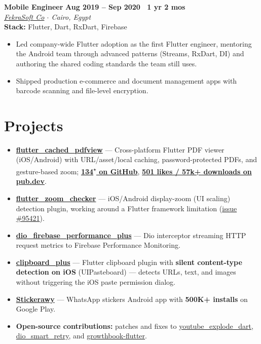\documentclass[10pt,a4paper]{article}
\newcommand{\workexp}[5]{
    \noindent \textbf{#1} \hfill \textbf{#2} \\
    \textit{#3} \\
    {\small\color{techstack}\textbf{Stack:} #4}
    \vspace{0pt}
    \begin{itemize}[itemsep=2.4pt,parsep=0pt,topsep=2pt,leftmargin=1.5em]
    #5
    \end{itemize}
    \vspace{3pt}
}
\begin{document}
    \workexp{Mobile Engineer}{Aug 2019 -- Sep 2020 \textbullet\ 1 yr 2 mos}
    {\href{https://www.linkedin.com/company/fekrasoft}{FekraSoft Co} $\cdot$ Cairo, Egypt}
    {Flutter, Dart, RxDart, Firebase}
    {
        \item Led company-wide Flutter adoption as the first Flutter engineer, mentoring the Android team through advanced patterns (Streams, RxDart, DI) and authoring the shared coding standards the team still uses.
    \item Shipped production e-commerce and document management apps with barcode scanning and file-level encryption.
    }



    \section{Projects}\label{sec:projects}
    \begin{itemize}[itemsep=3pt,parsep=0pt,topsep=2pt,leftmargin=1.5em]
    \item \textbf{\href{https://pub.dev/packages/flutter_cached_pdfview}{flutter\_cached\_pdfview}} --- Cross-platform Flutter PDF viewer (iOS/Android) with URL/asset/local caching, password-protected PDFs, and gesture-based zoom; \textbf{\href{https://github.com/binSaed/flutter_cached_pdfview}{134\textsuperscript{$\star$} on GitHub}}, \textbf{\href{https://pub.dev/packages/flutter_cached_pdfview}{501 likes / 57k+ downloads on pub.dev}}.
    \item \textbf{\href{https://pub.dev/packages/flutter_zoom_checker}{flutter\_zoom\_checker}} --- iOS/Android display-zoom (UI scaling) detection plugin, working around a Flutter framework limitation (\href{https://github.com/flutter/flutter/issues/95421}{issue \#95421}).
    \item \textbf{\href{https://github.com/binSaed/dio_firebase_performance_plus}{dio\_firebase\_performance\_plus}} --- Dio interceptor streaming HTTP request metrics to Firebase Performance Monitoring.
    \item \textbf{\href{https://pub.dev/packages/clipboard_plus}{clipboard\_plus}} --- Flutter clipboard plugin with \textbf{silent content-type detection on iOS} (UIPasteboard) --- detects URLs, text, and images without triggering the iOS paste permission dialog.
    \item \textbf{\href{https://play.google.com/store/apps/details?id=com.stickerawy.stickers}{Stickerawy}} --- WhatsApp stickers Android app with \textbf{500K+ installs} on Google Play.
    \item \textbf{Open-source contributions:} patches and fixes to \href{https://github.com/Hexer10/youtube_explode_dart/pull/371}{youtube\_explode\_dart}, \href{https://github.com/rodion-m/dio_smart_retry/pull/36}{dio\_smart\_retry}, and \href{https://github.com/growthbook/growthbook-flutter/pulls?q=author:binSaed}{growthbook-flutter}.
    \end{itemize}
\end{document}
